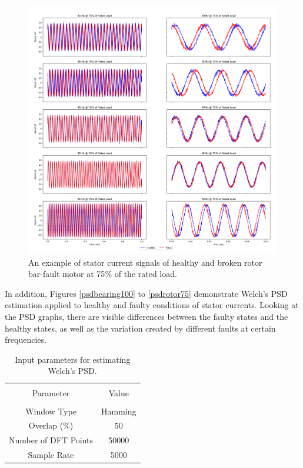 \pagebreak
\begin{figure}[p]
	\centering
	\includegraphics[width=0.75\paperwidth,keepaspectratio=true]{./fig/rotor_75.png}
	\caption{An example of stator current signals of healthy and broken rotor bar-fault motor at 75$\%$ of the rated load.}	
	\label{rotor75}
\end{figure}
\pagebreak
\clearpage
In addition, Figures \ref{psdbearing100} to \ref{psdrotor75} demonstrate Welch's PSD estimation applied to healthy and faulty conditions of stator currents. Looking at the PSD graphs, there are visible differences between the faulty states and the healthy states, as well as the variation created by different faults at certain frequencies.

\begin{table}[h]
	{\setlength{\tabcolsep}{12pt}
		\caption{Input parameters for estimating Welch's PSD.}
		\begin{center}
			\vspace{-6mm}
			\begin{tabular}{cc}
				\hline \\[-2.45ex] \hline \\[-2.1ex]
				Parameter & Value  \\
				\hline \\[-1.8ex]
				Window Type & Hamming    \\
				Overlap (\%) & 50 \\
				Number of DFT Points & 50000  \\
				Sample Rate & 5000    \\
				\hline
			\end{tabular}
			\vspace{-6mm}
		\end{center}
		\label{Table3.4}}
\end{table}
\pagebreak

